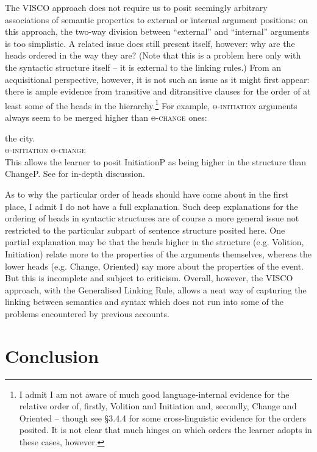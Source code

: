 \documentclass[output=paper]{langsci/langscibook}
\begin{document}
The VISCO approach does not require us to posit seemingly arbitrary
associations of semantic properties to external or internal argument positions:
on this approach, the two-way division between \enquote{external} and
\enquote{internal} arguments is too simplistic. A related issue does still
present itself, however: why are the heads ordered in the way they are? (Note
that this is a problem here only with the syntactic structure itself – it is
external to the linking rules.) From an acquisitional perspective, however, it
is not such an issue as it might first appear: there is ample evidence from
transitive and ditransitive clauses for the order of at least some of the heads
in the hierarchy.\footnote{I admit I am not aware of much good
language-internal evidence for the relative order of, firstly, Volition and
Initiation and, secondly, Change and Oriented – though see §3.4.4 for some
cross-linguistic evidence for the orders posited. It is not clear that much
hinges on which orders the learner adopts in these cases, however.} For
example, \textsc{θ-initiation} arguments always seem to be merged
higher than \textsc{θ-change} ones:

\ea
     {the city}.\\
            \textsc{θ-initiation} \textsc{θ-change}\\
\z
This allows the learner to posit InitiationP as being higher in the structure
than ChangeP. See \citet{Baker2018} for in-depth discussion.

As to why the particular order of heads should have come about in the first
place, I admit I do not have a full explanation. Such deep explanations for the
ordering of heads in syntactic structures are of course a more general issue
not restricted to the particular subpart of sentence structure posited here.
One partial explanation may be that the heads higher in the structure (e.g.
Volition, Initiation) relate more to the properties of the arguments
themselves, whereas the lower heads (e.g. Change, Oriented) say more about the
properties of the event. But this is incomplete and subject to criticism.
Overall, however, the VISCO approach, with the Generalised Linking Rule, allows
a neat way of capturing the linking between semantics and syntax which does not
run into some of the problems encountered by previous accounts.

\section{Conclusion}
\end{document}
